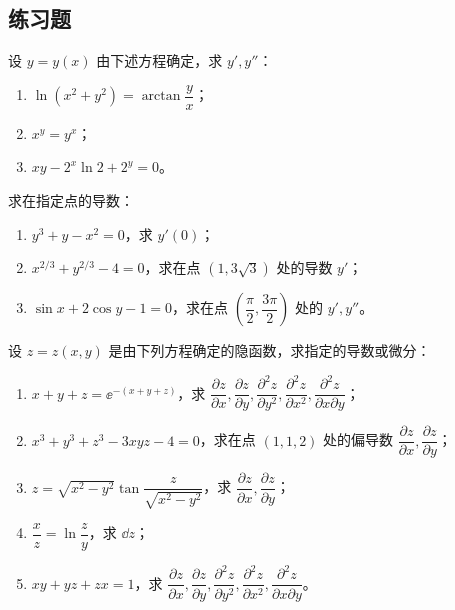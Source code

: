 \subsection{练习题}

\begin{xexercise}[1]
设 $y=y(x)$ 由下述方程确定，求 $y',y''$：
  \begin{enumerate}[label=(\arabic*)]
    \item $\ln(x^2+y^2)=\arctan\dfrac{y}{x}$；
    \item $x^y=y^x$；
    \item $xy-2^x\ln2+2^y=0$。
  \end{enumerate}
\end{xexercise}

\begin{xexercise}[2]
求在指定点的导数：
  \begin{enumerate}[label=(\arabic*)]
    \item $y^3+y-x^2=0$，求 $y'(0)$；
    \item $x^{2/3}+y^{2/3}-4=0$，求在点 $(1,3\sqrt3)$ 处的导数 $y'$；
    \item $\sin x+2\cos y-1=0$，求在点 $\left(\dfrac\pi2,\dfrac{3\pi}{2}\right)$ 处的 $y',y''$。
  \end{enumerate}
\end{xexercise}

\begin{xexercise}[3]
设 $z=z(x,y)$ 是由下列方程确定的隐函数，求指定的导数或微分：
  \begin{enumerate}[label=(\arabic*)]
    \item $x+y+z=\ee^{-(x+y+z)}$，求 $\dfrac{\partial z}{\partial x},\dfrac{\partial z}{\partial y},\dfrac{\partial^2z}{\partial y^2},\dfrac{\partial^2z}{\partial x^2},\dfrac{\partial^2z}{\partial x\partial y}$；
    \item $x^3+y^3+z^3-3xyz-4=0$，求在点 $(1,1,2)$ 处的偏导数 $\dfrac{\partial z}{\partial x},\dfrac{\partial z}{\partial y}$；
    \item $z=\sqrt{x^2-y^2}\tan\dfrac{z}{\sqrt{x^2-y^2}}$，求 $\dfrac{\partial z}{\partial x},\dfrac{\partial z}{\partial y}$；
    \item $\dfrac{x}{z}=\ln\dfrac{z}{y}$，求 $\dd z$；
    \item $xy+yz+zx=1$，求 $\dfrac{\partial z}{\partial x},\dfrac{\partial z}{\partial y},\dfrac{\partial^2z}{\partial y^2},\dfrac{\partial^2z}{\partial x^2},\dfrac{\partial^2z}{\partial x\partial y}$。
  \end{enumerate}
\end{xexercise}

